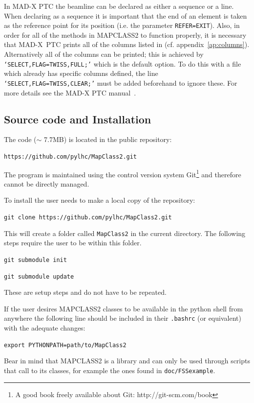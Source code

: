 \documentclass[a4paper]{cernatsnote}
\begin{document}
In \textsc{MAD-X PTC} the beamline can be declared as either a sequence
or a line. When declaring as a sequence it is important that the end
of an element is taken as the reference point for its position (i.e. the
parameter \texttt{REFER=EXIT}). Also, in order for all of the methods in
\textsc{MAPCLASS2} to function properly, it is necessary that MAD-X~PTC
prints all of the columns listed in (cf. appendix~\ref{ap:columns}).
Alternatively all of the columns can be printed; this is achieved by
\texttt{`SELECT,FLAG=TWISS,FULL;'} which is the default option. To do
this with a file which already has specific columns defined, the line
\texttt{`SELECT,FLAG=TWISS,CLEAR;'} must be added beforehand to ignore
these. For more details see the \textsc{MAD-X PTC} manual~\cite{madx}.

\subsection{Source code and Installation}
\def \codelocation {https://github.com/pylhc/MapClass2.git}

The code ($\sim$ 7.7MB) is located in the public repository:

\texttt{\codelocation}

The program is maintained using the control version system
Git\footnote{A good book freely available about Git: http://git-scm.com/book}
\cite{git} and therefore cannot be directly managed.

To install the user needs to make a local copy of the repository:

\texttt{git clone \codelocation}

This will create a folder called \texttt{MapClass2} in the current
directory. The following steps require the user to be within this
folder.

\texttt{git submodule init}

\texttt{git submodule update}

These are setup steps and do not have to be repeated.

If the user desires \textsc{MAPCLASS2} classes to be available in the
python shell from anywhere the following line should be included in
their \texttt{.bashrc} (or equivalent) with the adequate changes:

\texttt{export PYTHONPATH=path/to/MapClass2}

Bear in mind that \textsc{MAPCLASS2} is a library and can only be used
through scripts that call to its classes, for example the ones found
in \texttt{doc/FSSexample}.
\end{document}
